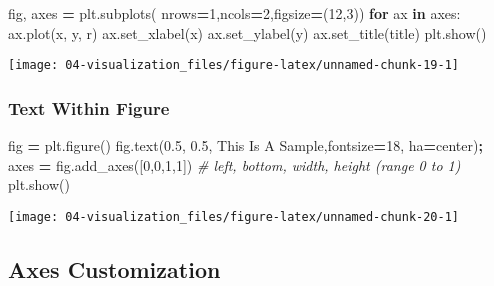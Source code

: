 \documentclass[
]{book}
\newenvironment{Shaded}{\begin{snugshade}}{\end{snugshade}}
\newcommand{\CommentTok}[1]{\textcolor[rgb]{0.37,0.37,0.37}{\textit{#1}}}
\newcommand{\ControlFlowTok}[1]{\textcolor[rgb]{0.27,0.27,0.27}{\textbf{#1}}}
\newcommand{\DecValTok}[1]{\textcolor[rgb]{0.06,0.06,0.06}{#1}}
\newcommand{\FloatTok}[1]{\textcolor[rgb]{0.06,0.06,0.06}{#1}}
\newcommand{\KeywordTok}[1]{\textcolor[rgb]{0.27,0.27,0.27}{\textbf{#1}}}
\newcommand{\NormalTok}[1]{#1}
\newcommand{\OperatorTok}[1]{\textcolor[rgb]{0.43,0.43,0.43}{\textbf{#1}}}
\newcommand{\StringTok}[1]{\textcolor[rgb]{0.5,0.5,0.5}{#1}}
\begin{document}
\begin{Shaded}
\begin{Highlighting}[]
\NormalTok{fig, axes }\OperatorTok{=}\NormalTok{ plt.subplots( nrows}\OperatorTok{=}\DecValTok{1}\NormalTok{,ncols}\OperatorTok{=}\DecValTok{2}\NormalTok{,figsize}\OperatorTok{=}\NormalTok{(}\DecValTok{12}\NormalTok{,}\DecValTok{3}\NormalTok{))}
\ControlFlowTok{for}\NormalTok{ ax }\KeywordTok{in}\NormalTok{ axes:}
\NormalTok{    ax.plot(x, y, }\StringTok{\textquotesingle{}r\textquotesingle{}}\NormalTok{)}
\NormalTok{    ax.set\_xlabel(}\StringTok{\textquotesingle{}x\textquotesingle{}}\NormalTok{)}
\NormalTok{    ax.set\_ylabel(}\StringTok{\textquotesingle{}y\textquotesingle{}}\NormalTok{)}
\NormalTok{    ax.set\_title(}\StringTok{\textquotesingle{}title\textquotesingle{}}\NormalTok{)}
\NormalTok{plt.show()}
\end{Highlighting}
\end{Shaded}

\texttt{[image: 04-visualization\_files/figure-latex/unnamed-chunk-19-1]}

\hypertarget{text-within-figure}{%
\subsubsection{Text Within Figure}\label{text-within-figure}}

\begin{Shaded}
\begin{Highlighting}[]
\NormalTok{fig }\OperatorTok{=}\NormalTok{ plt.figure()}
\NormalTok{fig.text(}\FloatTok{0.5}\NormalTok{, }\FloatTok{0.5}\NormalTok{, }\StringTok{\textquotesingle{}This Is A Sample\textquotesingle{}}\NormalTok{,fontsize}\OperatorTok{=}\DecValTok{18}\NormalTok{, ha}\OperatorTok{=}\StringTok{\textquotesingle{}center\textquotesingle{}}\NormalTok{)}\OperatorTok{;}
\NormalTok{axes }\OperatorTok{=}\NormalTok{ fig.add\_axes([}\DecValTok{0}\NormalTok{,}\DecValTok{0}\NormalTok{,}\DecValTok{1}\NormalTok{,}\DecValTok{1}\NormalTok{]) }\CommentTok{\# left, bottom, width, height (range 0 to 1)}
\NormalTok{plt.show()}
\end{Highlighting}
\end{Shaded}

\texttt{[image: 04-visualization\_files/figure-latex/unnamed-chunk-20-1]}

\hypertarget{axes-customization}{%
\subsection{Axes Customization}\label{axes-customization}}
\end{document}
